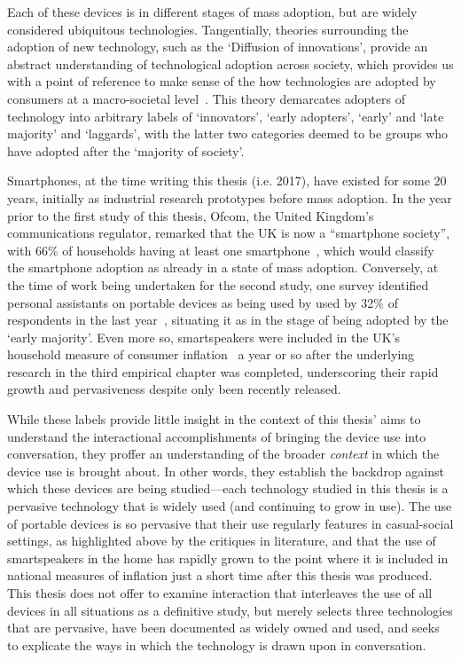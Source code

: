\begin{revisedsubmission}
Each of these devices is in different stages of mass adoption, but are widely considered ubiquitous technologies.
Tangentially, theories surrounding the adoption of new technology, such as the `Diffusion of innovations', provide an abstract understanding of technological adoption across society, which provides us with a point of reference to make sense of the how technologies are adopted by consumers at a macro-societal level~\citep{Rogers1995}.
This theory demarcates adopters of technology into arbitrary labels of `innovators', `early adopters', `early' and `late majority' and `laggards', with the latter two categories deemed to be groups who have adopted after the `majority of society'.

Smartphones, at the time writing this thesis (i.e. 2017), have existed for some 20 years, initially as industrial research prototypes before mass adoption.
In the year prior to the first study of this thesis, Ofcom, the United Kingdom's communications regulator, remarked that the UK is now a ``smartphone society'', with 66\% of households having at least one smartphone~\citep[p. 6]{Ofcom2015}, which would classify the smartphone adoption as already in a state of mass adoption.
Conversely, at the time of work being undertaken for the second study, one survey identified personal assistants on portable devices as being used by used by 32\% of respondents in the last year~\citep{AskYourTargetMarket2016}, situating it as in the stage of being adopted by the `early majority'.
Even more so, smartspeakers were included in the UK's household measure of consumer inflation~\citep{ONS2019} a year or so after the underlying research in the third empirical chapter was completed, underscoring their rapid growth and pervasiveness despite only been recently released.

While these labels provide little insight in the context of this thesis' aims to understand the interactional accomplishments of bringing the device use into conversation, they proffer an understanding of the broader \textit{context} in which the device use is brought about.
In other words, they establish the backdrop against which these devices are being studied---each technology studied in this thesis is a pervasive technology that is widely used (and continuing to grow in use).
The use of portable devices is so pervasive that their use regularly features in casual-social settings, as highlighted above by the critiques in literature, and that the use of smartspeakers in the home has rapidly grown to the point where it is included in national measures of inflation just a short time after this thesis was produced.
This thesis does not offer to examine interaction that interleaves the use of all devices in all situations as a definitive study, but merely selects three technologies that are pervasive, have been documented as widely owned and used, and seeks to explicate the ways in which the technology is drawn upon in conversation.
\end{revisedsubmission}

